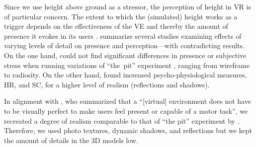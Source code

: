 Since we use height above ground as a stressor, the perception of height in \gls{VR} is of particular concern. The extent to which the (simulated) height works as a trigger depends on the effectiveness of the \gls{VE} and thereby the amount of presence it evokes in its users \autocite{Meehan2002}. \textcite{Gandy2010} summarize several studies examining effects of varying levels of detail on presence and perception---with contradicting results. On the one hand, \textcite{Zimmons2003} could not find significant differences in presence or subjective stress when running variations of “the~pit” experiment \autocite{Meehan2001}, ranging from wireframe to radiosity. On the other hand, \textcite{Slater2009} found increased psycho-physiological measures, \gls{HR}, and \gls{SC}, for a higher level of realism (reflections and shadows).

In alignment with \textcite{Gandy2010}, who summarized that a “[virtual] environment does not have to be visually perfect to make users feel present or capable of a motor task”, we recreated a degree of realism comparable to that of “the pit” experiment by \textcite{Meehan2002}. Therefore, we used photo textures, dynamic shadows, and reflections but we kept the amount of details in the 3D models low.